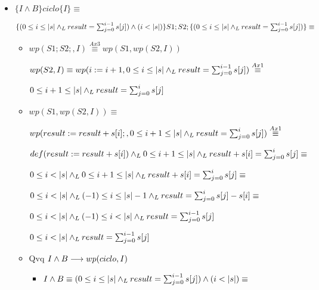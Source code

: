 \documentclass{article}
\begin{document}
\begin{itemize}
    \item $\{I \wedge B\} ciclo \{ I \} \equiv $

    $\{(0 \leq i \leq |s| \land _L result = \sum_{j=0}^{i-1} s[j]) \wedge (i < |s|)\} 
    S1;S2;
    \{(0 \leq i \leq |s| \land _L result = \sum_{j=0}^{i-1} s[j])\} \equiv$

    \begin{itemize}
        \item $wp(S1;S2;, I) \stackrel{Ax3}{\equiv} wp(S1, wp(S2, I))$
        
        $wp(S2, I) \equiv wp(i := i + 1, 0 \leq i \leq |s| \land _L result = \sum_{j=0}^{i-1} s[j]) \stackrel{Ax1}{\equiv}$
        
        $0 \leq i + 1 \leq |s| \land _L result = \sum_{j=0}^{i} s[j]$
    \end{itemize}

    \begin{itemize}
        \item $wp(S1,wp(S2, I)) \equiv$
        
        $wp(result := result + s[i];, 0 \leq i + 1 \leq |s| \land _L result = \sum_{j=0}^{i} s[j]) \stackrel{Ax1}{\equiv}$
        
        $def(result:= result + s[i]) \land _L 0 \leq i + 1 \leq |s| \land _L result + s[i] = \sum_{j=0}^{i} s[j] \equiv$

        $ 0 \leq i < |s| \land _L 0 \leq i + 1 \leq |s| \land _L result + s[i] = \sum_{j=0}^{i} s[j] \equiv$

        $ 0 \leq i < |s| \land _L (-1) \leq i \leq |s| - 1 \land _L result = \sum_{j=0}^{i} s[j] - s[i] \equiv$

        $ 0 \leq i < |s| \land _L (-1) \leq i < |s| \land _L result = \sum_{j=0}^{i-1} s[j] $

        $ 0 \leq i < |s| \land _L result = \sum_{j=0}^{i-1} s[j] $
    \end{itemize}

    \begin{itemize}
        \item Qvq $I \wedge B \longrightarrow wp(ciclo, I)$
        \begin{itemize}
            \item $I \wedge B \equiv (0 \leq i \leq |s| \land _L result = \sum_{j=0}^{i-1} s[j]) \wedge (i < |s|) \equiv$
            

\end{itemize}
\end{itemize}
\end{itemize}
\end{document}
